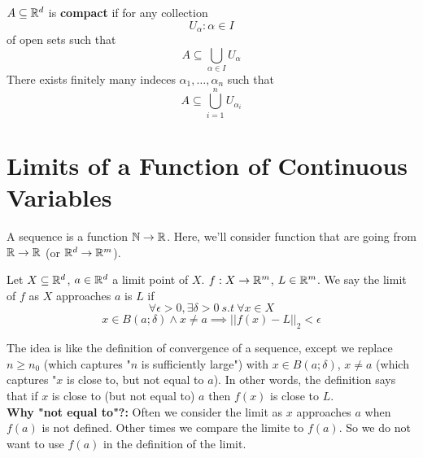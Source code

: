 \documentclass[openany]{report}
\begin{document}
\begin{definition}
    $A \subseteq \mathbb{R}^d$ is \textbf{compact} if for any collection
    \[U_\alpha: \alpha \in I\]
    of open sets such that 
    \[A \subseteq \bigcup_{\alpha \in I} U_\alpha\]
    There exists finitely many indeces $\alpha_1, \ldots, \alpha_n$ such that 
    \[A \subseteq \bigcup_{i=1}^n U_{\alpha_i}\]
\end{definition}
\chapter{Limits of a Function of Continuous Variables}
A sequence is a function $\mathbb{N} \rightarrow \mathbb{R}$. Here, we'll consider function 
that are going from $\mathbb{R} \rightarrow \mathbb{R}$ (or $\mathbb{R}^d \rightarrow \mathbb{R}^m$).
\begin{definition}
    Let $X \subseteq \mathbb{R}^d$, $a \in \mathbb{R}^d$ a limit point of $X$.
    $f: X \rightarrow \mathbb{R}^m$, $L \in \mathbb{R}^m$. We say the limit of $f$
    as $X$ approaches $a$ is $L$ if 
    $$\forall \epsilon > 0, \exists \delta > 0 \ s.t \ \forall x \in X$$
    $$x\in B(a;\delta) \wedge x \neq a \implies ||f(x)-L||_2 < \epsilon$$
\end{definition}

The idea is like the definition of convergence of a sequence, except we replace $n \geq n_0$
(which captures "$n$ is sufficiently large") with $x \in B(a;\delta)$, $x \neq a$ (which captures
"$x$ is close to, but not equal to $a$). In other words, the definition says
that if $x$ is close to (but not equal to) $a$
 then $f(x)$ is close to $L$.\\[2ex]

 \textbf{Why "not equal to"?:} Often we consider the limit as $x$ approaches
 $a$ when $f(a)$ is not defined. Other times we compare the limite to $f(a)$.
 So we do not want to use $f(a)$ in the definition of the limit. \\[2ex]
\end{document}

